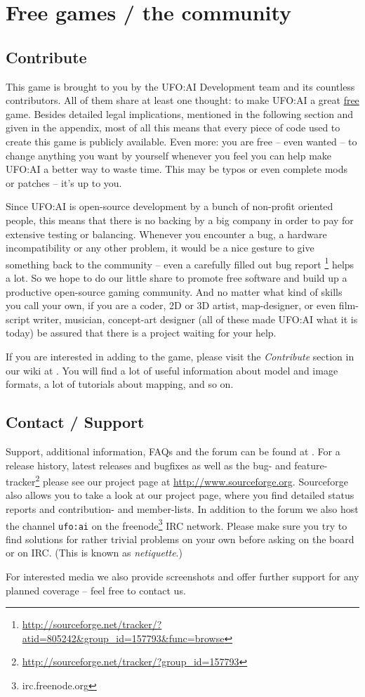 \section{Free games / the community}
\subsection{Contribute}
This game is brought to you by the UFO:AI Development team and its countless contributors. All of them share at least one thought: to make UFO:AI a great \underline{free} game. Besides detailed legal implications, mentioned in the following section and given in the appendix, most of all this means that every piece of code used to create this game is publicly available. Even more: you are free -- even wanted -- to change anything you want by yourself whenever you feel you can help make UFO:AI a better way to waste time. This may be typos or even complete mods or patches -- it's up to you.

Since UFO:AI is open-source development by a bunch of non-profit oriented people, this means that there is no backing by a big company in order to pay for extensive testing or balancing. Whenever you encounter a bug, a hardware incompatibility or any other problem, it would be a nice gesture to give something back to the community -- even a carefully filled out bug report \footnote{\url{http://sourceforge.net/tracker/?atid=805242&group_id=157793&func=browse}} helps a lot. So we hope to do our little share to promote free software and build up a productive open-source gaming community. And no matter what kind of skills you call your own, if you are a coder, 2D or 3D artist, map-designer, or even film-script writer, musician, concept-art designer (all of these made UFO:AI what it is today) be assured that there is a project waiting for your help.

If you are interested in adding to the game, please visit the \textit{Contribute} section in our wiki at \ufohomepage. You will find a lot of useful information about model and image formats, a lot of tutorials about mapping, and so on.

\subsection{Contact / Support}
Support, additional information, FAQs and the forum can be found at \ufohomepage.
For a release history, latest releases and bugfixes as well as the bug- and feature-tracker\footnote{\url{http://sourceforge.net/tracker/?group_id=157793}} please see our project page at \url{http://www.sourceforge.org}. Sourceforge also allows you to take a look at our project page, where you find detailed status reports and contribution- and member-lists. In addition to the forum we also host the channel \texttt{ufo:ai} on the freenode\footnote{irc.freenode.org} IRC network. Please make sure you try to find solutions for rather trivial problems on your own before asking on the board or on IRC.  (This is known as \emph{netiquette}.)

For interested media we also provide screenshots and offer further support for any planned coverage -- feel free to contact us.

